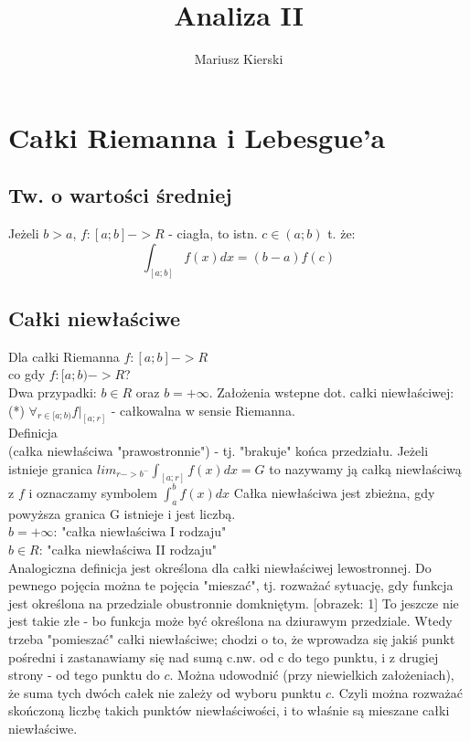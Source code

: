 \documentclass[12pt,a4paper,article]{memoir} %
\title{Analiza II}
\author{Mariusz Kierski}
\begin{document}
\maketitle
\tableofcontents* %

\chapter{Całki Riemanna i Lebesgue'a}
\section{Tw. o wartości średniej}
Jeżeli $b>a$, $f:[a;b]->R$ - ciagła, to istn. $c \in (a;b)$ t. że:
\[ \int_{[a;b]}f(x)dx = (b-a)f(c) \]
\section{Całki niewłaściwe}
Dla całki Riemanna $f : [a;b] -> R$ \\
co gdy $f:[a;b)->R$? \\
Dwa przypadki: $ b \in R $ oraz $ b = +\infty $.
Założenia wstepne dot. całki niewłaściwej:  
(*) $ \forall_{r \in [a;b)} f |_{[a;r]} $ - całkowalna w sensie Riemanna. \\
 Definicja \\ 
(całka niewłaściwa "prawostronnie") - tj. "brakuje" końca przedziału.
Jeżeli istnieje granica $ lim_{r -> b^{-}} \int_{[a;r]} f(x)dx = G $ to nazywamy ją całką niewłaściwą z $f$ i oznaczamy symbolem $\int_{a}^{b} f(x)dx $
Całka niewłaściwa jest zbieżna, gdy powyższa granica G istnieje i jest liczbą. \\
$b = +\infty $: "całka niewłaściwa I rodzaju"\\
$b \in R $: "całka niewłaściwa II rodzaju"\\
Analogiczna definicja jest określona dla całki niewłaściwej lewostronnej.
Do pewnego pojęcia można te pojęcia "mieszać", tj. rozważać sytuację, gdy funkcja jest określona na przedziale obustronnie domkniętym. [obrazek: 1]
To jeszcze nie jest takie złe - bo funkcja może być określona na dziurawym przedziale. Wtedy trzeba "pomieszać" całki niewłaściwe; chodzi o to, że wprowadza się jakiś punkt pośredni i zastanawiamy się nad sumą c.nw. od c do tego punktu, i z drugiej strony - od tego punktu do $c$. Można udowodnić (przy niewielkich założeniach), że suma tych dwóch całek nie zależy od wyboru punktu $c$. Czyli można rozważać skończoną liczbę takich punktów niewłaściwości, i to właśnie są mieszane całki niewłaściwe.
\end{document}
